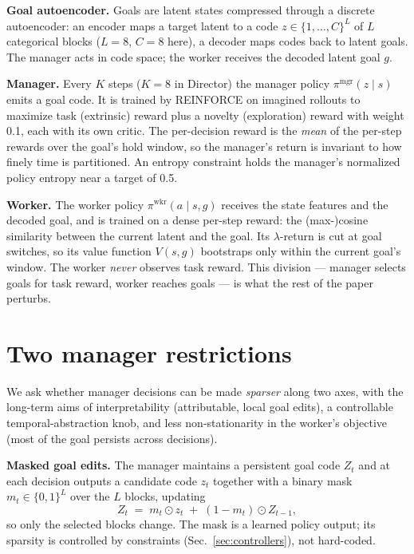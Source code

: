 \documentclass[10pt]{article}
\begin{document}
\textbf{Goal autoencoder.} Goals are latent states compressed through a discrete
autoencoder: an encoder maps a target latent to a code
$z \in \{1,\dots,C\}^{L}$ of $L$ categorical blocks ($L{=}8$, $C{=}8$ here), a
decoder maps codes back to latent goals. The manager acts in code space; the
worker receives the decoded latent goal $g$.

\textbf{Manager.} Every $K$ steps ($K{=}8$ in Director) the manager policy
$\pi^{\text{mgr}}(z \mid s)$ emits a goal code. It is trained by REINFORCE on
imagined rollouts to maximize task (extrinsic) reward plus a novelty
(exploration) reward with weight 0.1, each with its own critic. The per-decision
reward is the \emph{mean} of the per-step rewards over the goal's hold window,
so the manager's return is invariant to how finely time is partitioned. An
entropy constraint holds the manager's normalized policy entropy near a target
of 0.5.

\textbf{Worker.} The worker policy $\pi^{\text{wkr}}(a \mid s, g)$ receives the
state features and the decoded goal, and is trained on a dense per-step reward:
the (max-)cosine similarity between the current latent and the goal. Its
$\lambda$-return is cut at goal switches, so its value function
$V(s, g)$ bootstraps only within the current goal's window. The worker
\emph{never} observes task reward. This division --- manager selects goals for
task reward, worker reaches goals --- is what the rest of the paper perturbs.

\section{Two manager restrictions}
\label{sec:restrictions}

We ask whether manager decisions can be made \emph{sparser} along two axes,
with the long-term aims of interpretability (attributable, local goal edits), a
controllable temporal-abstraction knob, and less non-stationarity in the
worker's objective (most of the goal persists across decisions).

\textbf{Masked goal edits.} The manager maintains a persistent goal code $Z_t$
and at each decision outputs a candidate code $z_t$ together with a binary mask
$m_t \in \{0,1\}^{L}$ over the $L$ blocks, updating
\begin{equation}
Z_{t} \;=\; m_t \odot z_t \;+\; (1-m_t)\odot Z_{t-1},
\label{eq:edit}
\end{equation}
so only the selected blocks change. The mask is a learned policy output; its
sparsity is controlled by constraints (Sec.~\ref{sec:controllers}), not
hard-coded.
\end{document}
